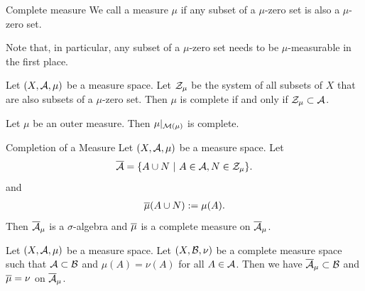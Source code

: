 \begin{importantdefinition}{Complete measure}{}
	We call a measure $\mu$  if any subset of a $\mu$-zero set is also a $\mu$-zero set.
\end{importantdefinition}
Note that, in particular, any subset of a $\mu$-zero set needs to be $\mu$-measurable in the first place.
\begin{lemma}
	Let $(X, \mathcal{A}, \mu)$ be a measure space. Let
	$\mathcal{Z}_\mu$ be the system of all subsets of $X$ that are also subsets of a $\mu$-zero set. Then $\mu$ is complete if and only if $\mathcal{Z}_\mu \subset \mathcal{A}$.
\end{lemma}
\begin{corollary}
	Let $\mu$ be an outer measure. Then $\mu|_{\mathcal{M}(\mu)}$ is complete.
\end{corollary}
\begin{importanttheorem}{Completion of a Measure}{}
	Let $(X, \mathcal{A}, \mu)$ be a measure space.  Let
	\begin{align*}
		\overline{{\mathcal{A}}} = \qty{A \cup N ~\middle|~A \in \mathcal{A}, N \in \mathcal{Z}_\mu}.
	\end{align*}
	and
	\begin{align*}
		\overline{{\mu}}(A \cup N) := \mu(A).
	\end{align*}
	Then $\overline{{\mathcal{A}}}_\mu$ is a $\sigma$-algebra and $\overline{{\mu}}$ is a complete measure on $\overline{{\mathcal{A}}}_\mu$.
\end{importanttheorem}
\begin{theorem}
	Let $(X, \mathcal{A}, \mu)$ be a measure space. Let $(X, \mathcal{B}, \nu)$ be a complete measure space such that $\mathcal{A} \subset \mathcal{B}$ and $\mu(A) = \nu(A)$ for all $A \in \mathcal{A}$. Then we have $\overline{{\mathcal{A}}}_\mu \subset \mathcal{B}$ and $\overline{{\mu}} = \nu$ on $\overline{{\mathcal{A}}}_\mu$.
\end{theorem}
\clearpage

